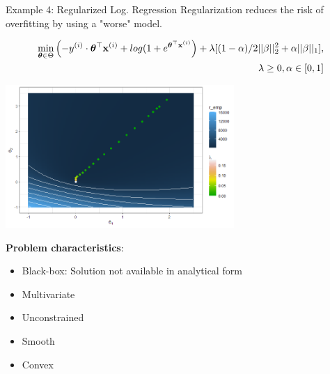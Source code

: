 \documentclass[11pt,compress,t,notes=noshow, xcolor=table]{beamer}
\begin{document}
\begin{vbframe}{Example 4: Regularized Log. Regression}
Regularization reduces the risk of overfitting by using a "worse" model.

\setlength{\abovedisplayskip}{1pt}
\setlength{\belowdisplayskip}{1pt}

\begin{eqnarray*}
	\min_{\bm{\theta} \in \Theta} \left(-y^{(i)} \cdot \bm{\theta}^\top\mathbf{x}^{(i)} + log(1 + e^{\bm{\theta}^\top\mathbf{x}^{(i)}}\right) + \lambda[(1-\alpha)/2||\beta||^{2}_{2} + \alpha||\beta||_{1}],\\ \lambda \geq 0, \alpha \in [0,1]
\end{eqnarray*}

\begin{center}
\includegraphics[width=0.65\textwidth]{figure_man/logreg_regul.png}
\end{center}

\framebreak
\textbf{Problem characteristics}:
\begin{itemize}
	\item Black-box: Solution not available in analytical form
	\item Multivariate
	\item Unconstrained
	\item Smooth
	\item Convex
\end{itemize}

\end{vbframe}
\end{document}
